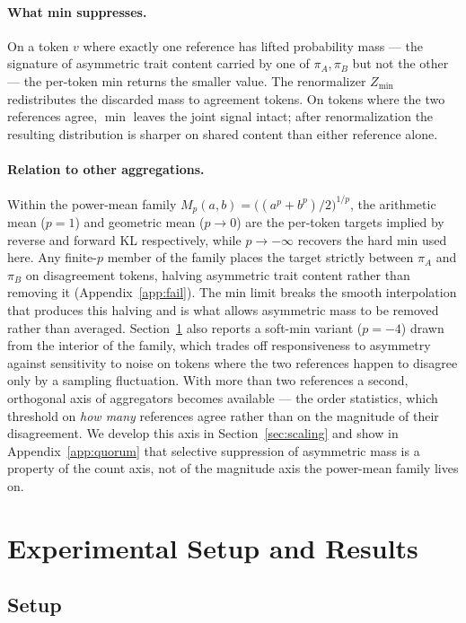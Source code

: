 \documentclass[11pt]{article}
\begin{document}
\paragraph{What min suppresses.} On a token $v$ where exactly one reference has lifted probability mass --- the signature of asymmetric trait content carried by one of $\pi_A, \pi_B$ but not the other --- the per-token min returns the smaller value. The renormalizer $Z_{\min}$ redistributes the discarded mass to agreement tokens. On tokens where the two references agree, $\min$ leaves the joint signal intact; after renormalization the resulting distribution is sharper on shared content than either reference alone.

\paragraph{Relation to other aggregations.} Within the power-mean family $M_p(a, b) = \bigl((a^p + b^p)/2\bigr)^{1/p}$, the arithmetic mean ($p = 1$) and geometric mean ($p \to 0$) are the per-token targets implied by reverse and forward KL respectively, while $p \to -\infty$ recovers the hard min used here. Any finite-$p$ member of the family places the target strictly between $\pi_A$ and $\pi_B$ on disagreement tokens, halving asymmetric trait content rather than removing it (Appendix~\ref{app:fail}). The min limit breaks the smooth interpolation that produces this halving and is what allows asymmetric mass to be removed rather than averaged. Section~\ref{sec:results} also reports a soft-min variant ($p = -4$) drawn from the interior of the family, which trades off responsiveness to asymmetry against sensitivity to noise on tokens where the two references happen to disagree only by a sampling fluctuation. With more than two references a second, orthogonal axis of aggregators becomes available --- the order statistics, which threshold on \emph{how many} references agree rather than on the magnitude of their disagreement. We develop this axis in Section~\ref{sec:scaling} and show in Appendix~\ref{app:quorum} that selective suppression of asymmetric mass is a property of the count axis, not of the magnitude axis the power-mean family lives on.

\section{Experimental Setup and Results}
\label{sec:results}

\subsection{Setup}
\end{document}
